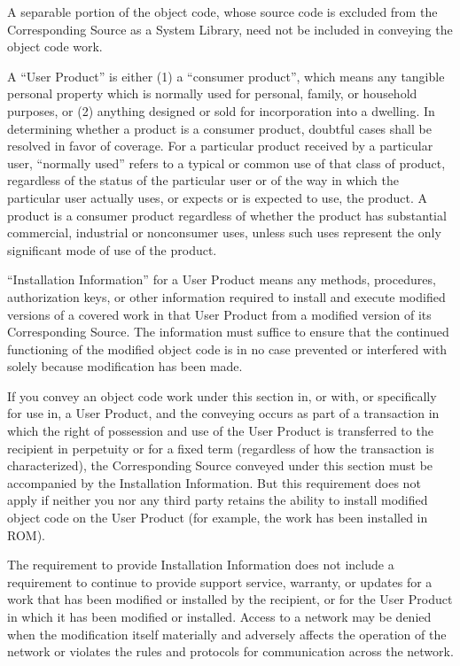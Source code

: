 \documentclass[letterpaper,10pt,english]{sphinxmanual}
\begin{document}
\sphinxAtStartPar
A separable portion of the object code, whose source code is excluded
from the Corresponding Source as a System Library, need not be
included in conveying the object code work.

\sphinxAtStartPar
A “User Product” is either (1) a “consumer product”, which means any
tangible personal property which is normally used for personal, family,
or household purposes, or (2) anything designed or sold for incorporation
into a dwelling.  In determining whether a product is a consumer product,
doubtful cases shall be resolved in favor of coverage.  For a particular
product received by a particular user, “normally used” refers to a
typical or common use of that class of product, regardless of the status
of the particular user or of the way in which the particular user
actually uses, or expects or is expected to use, the product.  A product
is a consumer product regardless of whether the product has substantial
commercial, industrial or non\sphinxhyphen{}consumer uses, unless such uses represent
the only significant mode of use of the product.

\sphinxAtStartPar
“Installation Information” for a User Product means any methods,
procedures, authorization keys, or other information required to install
and execute modified versions of a covered work in that User Product from
a modified version of its Corresponding Source.  The information must
suffice to ensure that the continued functioning of the modified object
code is in no case prevented or interfered with solely because
modification has been made.

\sphinxAtStartPar
If you convey an object code work under this section in, or with, or
specifically for use in, a User Product, and the conveying occurs as
part of a transaction in which the right of possession and use of the
User Product is transferred to the recipient in perpetuity or for a
fixed term (regardless of how the transaction is characterized), the
Corresponding Source conveyed under this section must be accompanied
by the Installation Information.  But this requirement does not apply
if neither you nor any third party retains the ability to install
modified object code on the User Product (for example, the work has
been installed in ROM).

\sphinxAtStartPar
The requirement to provide Installation Information does not include a
requirement to continue to provide support service, warranty, or updates
for a work that has been modified or installed by the recipient, or for
the User Product in which it has been modified or installed.  Access to a
network may be denied when the modification itself materially and
adversely affects the operation of the network or violates the rules and
protocols for communication across the network.
\end{document}
